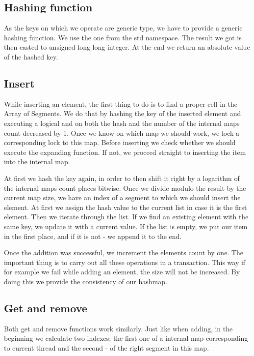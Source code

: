 \subsection{Hashing function}
    As the keys on which we operate are generic type, we have to provide a generic hashing function. We use the one from the std namespace. The result we got is then casted to unsigned long long integer. At the end we return an absolute value of the hashed key.
    
\subsection{Insert}
    While inserting an element, the first thing to do is to find a proper cell in the Array of Segments. We do that by hashing the key of the inserted element and executing a logical and on both the hash and the number of the internal maps count decreased by 1. Once we know on which map we should work, we lock a corresponding lock to this map. Before inserting we check whether we should execute the expanding function. If not, we proceed straight to inserting the item into the internal map.
        
    At first we hash the key again, in order to then shift it right by a logarithm of the internal maps count places bitwise. Once we divide modulo the result by the current map size, we have an index of a segment to which we should insert the element. At first we assign the hash value to the current list in case it is the first element. Then we iterate through the list. If we find an existing element with the same key, we update it with a current value. If the list is empty, we put our item in the first place, and if it is not - we append it to the end.
        
    Once the addition was successful, we increment the elements count by one. The important thing is to carry out all these operations in a transaction. This way if for example we fail while adding an element, the size will not be increased. By doing this we provide the consistency of our hashmap.
        
\subsection{Get and remove}
    Both get and remove functions work similarly. Just like when adding, in the beginning we calculate two indexes: the first one of a internal map corresponding to current thread and the second - of the right segment in this map. 
        
